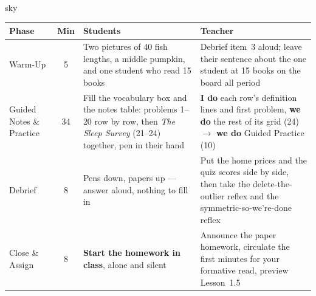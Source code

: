 \documentclass[10pt]{article}
\begin{document}
\boxguard[30]
\begin{skillbox}{sky}
\renewcommand{\arraystretch}{1.25}
\begin{tabularx}{\linewidth}{@{}l c X X@{}}
\textbf{Phase} & \textbf{Min} & \textbf{Students} & \textbf{Teacher} \\
\hline
Warm-Up & 5 & Two pictures of 40 fish lengths, a middle pumpkin, and one student who read 15
  books & Debrief item~3 aloud; leave their sentence about the one student at 15 books on the
  board all period \\
Guided Notes \& Practice & 34 & Fill the vocabulary box and the notes table: problems 1--20
  row by row, then \emph{The Sleep Survey} (21--24) together, pen in their hand & \textbf{I do}
  each row's definition lines and first problem, \textbf{we do} the rest of its grid (24) $\to$
  \textbf{we do} Guided Practice (10) \\
Debrief & 8 & Pens down, papers up --- answer aloud, nothing to fill in & Put the home prices
  and the quiz scores side by side, then take the delete-the-outlier reflex and the
  symmetric-so-we're-done reflex \\
Close \& Assign & 8 & \textbf{Start the homework in class}, alone and silent & Announce the
  paper homework, circulate the first minutes for your formative read, preview Lesson~1.5 \\
\end{tabularx}
\end{skillbox}
\end{document}
